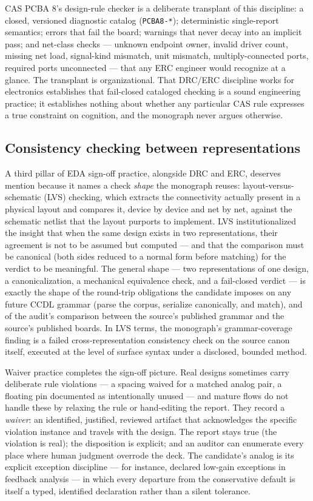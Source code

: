 CAS PCBA 8's design-rule checker is a deliberate transplant of this
discipline: a closed, versioned diagnostic catalog (\texttt{PCBA8-*});
deterministic single-report semantics; errors that fail the board;
warnings that never decay into an implicit pass; and net-class checks ---
unknown endpoint owner, invalid driver count, missing net load,
signal-kind mismatch, unit mismatch, multiply-connected ports, required
ports unconnected --- that any ERC engineer would recognize at a glance.
The transplant is organizational. That DRC/ERC discipline works for
electronics establishes that fail-closed cataloged checking is a sound
engineering practice; it establishes nothing about whether any particular
CAS rule expresses a true constraint on cognition, and the monograph
never argues otherwise.

\subsection{Consistency checking between representations}\label{ch02:eda:lvs}

A third pillar of EDA sign-off practice, alongside DRC and ERC, deserves
mention because it names a check \emph{shape} the monograph reuses:
layout-versus-schematic (LVS) checking, which extracts the connectivity
actually present in a physical layout and compares it, device by device
and net by net, against the schematic netlist that the layout purports to
implement. LVS institutionalized the insight that when the same design
exists in two representations, their agreement is not to be assumed but
computed --- and that the comparison must be canonical (both sides reduced
to a normal form before matching) for the verdict to be meaningful. The
general shape --- two representations of one design, a canonicalization,
a mechanical equivalence check, and a fail-closed verdict --- is exactly
the shape of the round-trip obligations the candidate imposes on any
future CCDL grammar (parse the corpus, serialize canonically, and match),
and of the audit's comparison between the source's published grammar and
the source's published boards. In LVS terms, the monograph's
grammar-coverage finding is a failed cross-representation consistency
check on the source canon itself, executed at the level of surface
syntax under a disclosed, bounded method.

Waiver practice completes the sign-off picture. Real designs sometimes
carry deliberate rule violations --- a spacing waived for a matched
analog pair, a floating pin documented as intentionally unused --- and
mature flows do not handle these by relaxing the rule or hand-editing
the report. They record a \emph{waiver}: an identified, justified,
reviewed artifact that acknowledges the specific violation instance and
travels with the design. The report stays true (the violation is real);
the disposition is explicit; and an auditor can enumerate every place
where human judgment overrode the deck. The candidate's analog is its
explicit exception discipline --- for instance, declared low-gain
exceptions in feedback analysis --- in which every departure from the
conservative default is itself a typed, identified declaration rather
than a silent tolerance.

